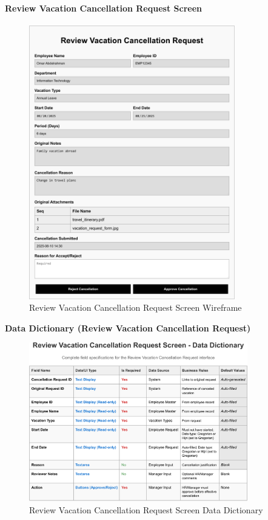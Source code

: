 \documentclass[12pt,a4paper]{article}
\begin{document}
\paragraph{Review Vacation Cancellation Request Screen}
\begin{figure}[H]
\centering
\includegraphics[width=0.8\textwidth]{Wireframes/Review-Vacation-Cancellation-Request/Review-Vacation-Cancellation-Request-1.png}
\caption{Review Vacation Cancellation Request Screen Wireframe}
\label{fig:wireframe-review-cancellation}
\end{figure}

\noindent\textbf{Data Dictionary (Review Vacation Cancellation Request)}
\begin{figure}[H]
\centering
\includegraphics[width=0.85\textwidth]{Data-Dictionary/Screen-Data-Dictionaries/Review-Vacation-Cancellation-Request-Screen-Data-Dictionary/Review-Vacation-Cancellation-Request-Screen-Data-Dictionary-1.png}
\caption{Review Vacation Cancellation Request Screen Data Dictionary}
\label{fig:review-cancellation-data-dict-inline}
\end{figure}
\end{document}
